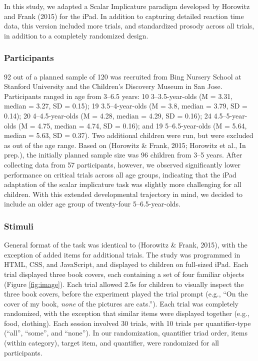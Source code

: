 \documentclass[10pt, letterpaper]{article}
\begin{document}
In this study, we adapted a Scalar Implicature paradigm developed by
Horowitz and Frank (2015) for the iPad. In addition to capturing
detailed reaction time data, this version included more trials, and
standardized prosody across all trials, in addition to a completely
randomized design.

\subsubsection{Participants}\label{participants}

92 out of a planned sample of 120 was recruited from Bing Nursery School
at Stanford University and the Children's Discovery Museum in San Jose.
Participants ranged in age from 3--6.5 years: 10 3--3.5-year-olds (M =
3.31, median = 3.27, SD = 0.15); 19 3.5--4-year-olds (M = 3.8, median =
3.79, SD = 0.14); 20 4--4.5-year-olds (M = 4.28, median = 4.29, SD =
0.16); 24 4.5--5-year-olds (M = 4.75, median = 4.74, SD = 0.16); and 19
5--6.5-year-olds (M = 5.64, median = 5.63, SD = 0.37). Two additional
children were run, but were excluded as out of the age range. Based on
(Horowitz \& Frank, 2015; Horowitz et al., In prep.), the initially
planned sample size was 96 children from 3--5 years. After collecting
data from 57 participants, however, we observed significantly lower
performance on critical trials across all age groups, indicating that
the iPad adaptation of the scalar implicature task was slightly more
challenging for all children. With this extended developmental
trajectory in mind, we decided to include an older age group of
twenty-four 5--6.5-year-olds.

\subsubsection{Stimuli}\label{stimuli}

General format of the task was identical to (Horowitz \& Frank, 2015),
with the exception of added items for additional trials. The study was
programmed in HTML, CSS, and JavaScript, and displayed to children on
full-sized iPad. Each trial displayed three book covers, each containing
a set of four familiar objects (Figure \ref{fig:image}). Each trial
allowed 2.5s for children to visually inspect the three book covers,
before the experiment played the trial prompt (e.g., ``On the cover of
my book, \emph{none} of the pictures are cats.''). Each trial was
completely randomized, with the exception that similar items were
displayed together (e.g., food, clothing). Each session involved 30
trials, with 10 trials per quantifier-type (``all'', ``some'', and
``none''). In our randomization, quantifier triad order, items (within
category), target item, and quantifier, were randomized for all
participants.
\end{document}
